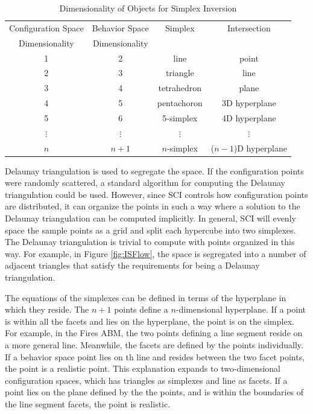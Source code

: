 \begin{table}[ht]
  \caption{Dimensionality of Objects for Simplex Inversion}
  \centering
  \begin{tabular}{c c c c}
    \hline \hline
    Configuration Space & Behavior Space & Simplex & Intersection \\
    Dimensionality      & Dimensionality &         &  \\
    \hline
    1 & 2 & line & point \\
    2 & 3 & triangle & line \\
    3 & 4 & tetrahedron & plane \\
    4 & 5 & pentachoron & 3D hyperplane \\
    5 & 6 & 5-simplex & 4D hyperplane \\
    $\vdots$ & $\vdots$ & $\vdots$ & $\vdots$ \\
    $n$ & $n + 1$ & $n$-simplex & ($n-1$)D hyperplane \\
    \hline
  \end{tabular}
  \label{table:dims}
\end{table}

Delaunay triangulation is used to segregate the space.
If the configuration points were randomly scattered, a standard algorithm for computing the Delaunay triangulation could be used.
However, since SCI controls how configuration points are distributed, it can organize the points in such a way where a solution to the Delaunay triangulation can be computed implicitly.
In general, SCI will evenly space the sample points as a grid and split each hypercube into two simplexes.
The Delaunay triangulation is trivial to compute with points organized in this way.
For example, in Figure \ref{fig:ISFlow}, the space is segregated into a number of adjacent triangles that satisfy the requirements for being a Delaunay triangulation.

The equations of the simplexes can be defined in terms of the hyperplane in which they reside.
The $n+1$ points define a $n$-dimensional hyperplane.
If a point is within all the facets and lies on the hyperplane, the point is on the simplex.
For example, in the Fires ABM, the two points defining a line segment reside on a more general line.
Meanwhile, the facets are defined by the points individually.
If a behavior space point lies on th line and resides between the two facet points, the point is a realistic point.
This explanation expands to two-dimensional configuration spaces, which has triangles as simplexes and line as facets.
If a point lies on the plane defined by the the points, and is within the boundaries of the line segment facets, the point is realistic.


